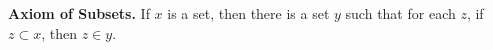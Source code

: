 \textbf{Axiom of Subsets.} If $x$ is a set, then there is a set $y$ such that for each $z$, if $z \subset x$, then $z \in y$.
